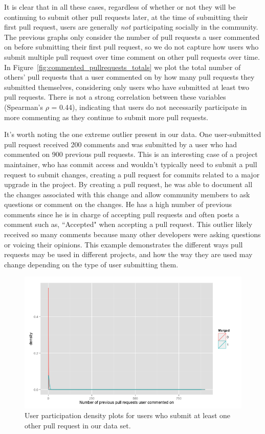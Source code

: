\documentclass{sigchi}
\begin{document}
It is clear that in all these cases, regardless of whether or not they will be
continuing to submit other pull requests later, at the time of submitting their
first pull request, users are generally \textit{not} participating socially in
the community. The previous graphs only consider the number of pull requests a
user commented on before submitting their first pull request, so we do not
capture how users who submit multiple pull request over time comment on other
pull requests over time. In Figure~\ref{fig:commented_pullrequests_totals} we
plot the total number of others' pull requests that a user commented on by how
many pull requests they submitted themselves, considering only users who have
submitted at least two pull requests. There is not a strong correlation between
these variables (Spearman's $\rho$ = 0.44), indicating that users do not
necessarily participate in more commenting as they continue to submit more pull
requests.

It's worth noting the one extreme outlier present in our data. One
user-submitted pull request received 200 comments and was submitted by a user
who had commented on 900 previous pull requests. This is an interesting case of
a project maintainer, who has commit access and wouldn't typically need to
submit a pull request to submit changes, creating a pull request for commits
related to a major upgrade in the project. By creating a pull request, he was
able to document all the changes associated with this change and allow community
members to ask questions or comment on the changes. He has a high number of
previous comments since he is in charge of accepting pull requests and often
posts a comment such as, ``Accepted" when accepting a pull request. This outlier
likely received so many comments because many other developers were asking
questions or voicing their opinions. This example demonstrates the different
ways pull requests may be used in different projects, and how the way they are
used may change depending on the type of user submitting them.

\begin{figure}[p] \centering
\includegraphics[width=0.9\columnwidth]{figures/number_comments_density_repeaters_ggplot.png}
\caption{User participation density plots for users who submit at least one
other pull request in our data set.} \label{fig:repeaters} \end{figure}
\end{document}
